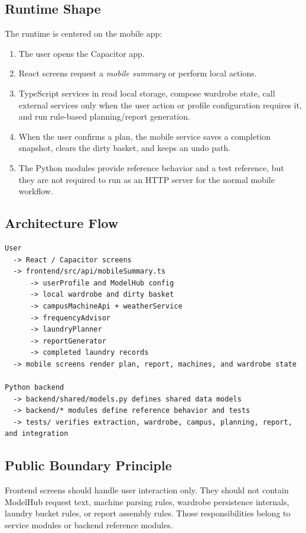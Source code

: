 \documentclass[11pt,a4paper]{article}
\begin{document}
\subsection{Runtime Shape}

The runtime is centered on the mobile app:

\begin{enumerate}
  \item The user opens the Capacitor app.
  \item React screens request a \emph{mobile summary} or perform local actions.
  \item TypeScript services in  read local storage, compose wardrobe state, call external services only when the user action or profile configuration requires it, and run rule-based planning/report generation.
  \item When the user confirms a plan, the mobile service saves a completion snapshot, clears the dirty basket, and keeps an undo path.
  \item The Python modules provide reference behavior and a test reference, but they are not required to run as an HTTP server for the normal mobile workflow.
\end{enumerate}

\subsection{Architecture Flow}

\begin{lstlisting}[style=command]
User
  -> React / Capacitor screens
  -> frontend/src/api/mobileSummary.ts
      -> userProfile and ModelHub config
      -> local wardrobe and dirty basket
      -> campusMachineApi + weatherService
      -> frequencyAdvisor
      -> laundryPlanner
      -> reportGenerator
      -> completed laundry records
  -> mobile screens render plan, report, machines, and wardrobe state

Python backend
  -> backend/shared/models.py defines shared data models
  -> backend/* modules define reference behavior and tests
  -> tests/ verifies extraction, wardrobe, campus, planning, report, and integration
\end{lstlisting}

\subsection{Public Boundary Principle}

Frontend screens should handle user interaction only. They should not contain ModelHub request text, machine parsing rules, wardrobe persistence internals, laundry bucket rules, or report assembly rules. Those responsibilities belong to service modules or backend reference modules.
\end{document}
